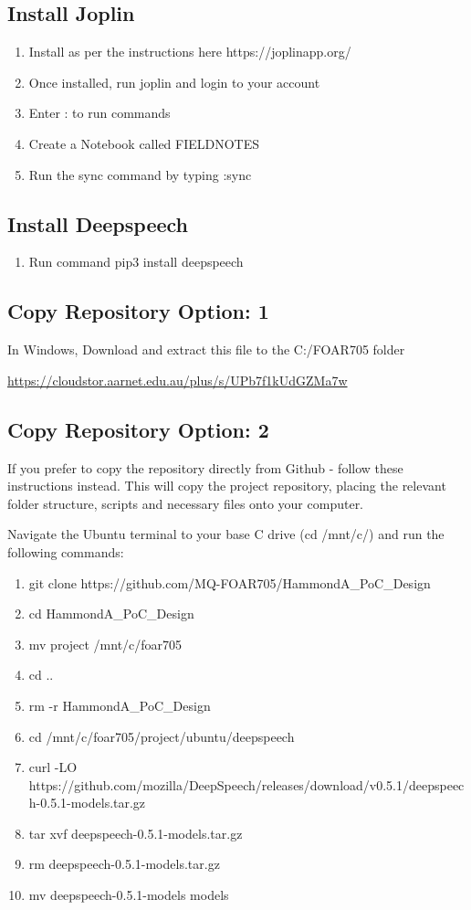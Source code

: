 \documentclass{article}
\begin{document}
\subsection{Install Joplin}
\begin{enumerate}
    \item Install as per the instructions here https://joplinapp.org/
    \item Once installed, run joplin and login to your account
    \item Enter : to run commands
    \item Create a Notebook called FIELDNOTES
    \item Run the sync command by typing :sync
\end{enumerate}

\subsection{Install Deepspeech}
\begin{enumerate}
    \item Run command pip3 install deepspeech
\end{enumerate}


\subsection{Copy Repository Option: 1}
In Windows, Download and extract this file to the C:/FOAR705 folder

\url{https://cloudstor.aarnet.edu.au/plus/s/UPb7f1kUdGZMa7w}


\subsection{Copy Repository Option: 2}
If you prefer to copy the repository directly from Github - follow these instructions instead. This will copy the project repository, placing the relevant folder structure, scripts and necessary files onto your computer. 

Navigate the Ubuntu terminal to your base C drive (cd /mnt/c/) and run the following commands:
\begin{enumerate}
    \item git clone https://github.com/MQ-FOAR705/HammondA\_PoC\_Design
    \item cd HammondA\_PoC\_Design
    \item mv project /mnt/c/foar705
    \item cd ..
    \item rm -r HammondA\_PoC\_Design
    \item cd /mnt/c/foar705/project/ubuntu/deepspeech
    \item curl -LO https://github.com/mozilla/DeepSpeech/releases/download/v0.5.1/deepspeech-0.5.1-models.tar.gz
    \item tar xvf deepspeech-0.5.1-models.tar.gz
    \item rm deepspeech-0.5.1-models.tar.gz
    \item mv deepspeech-0.5.1-models models
\end{enumerate}
\end{document}
